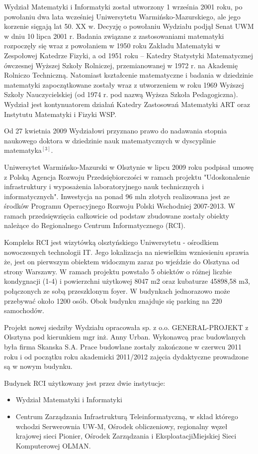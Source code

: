 \documentclass[a4paper,12pt]{article}
\begin{document}
Wydział Matematyki i Informatyki został utworzony 1 września 2001 roku, po powołaniu dwa lata wcześniej Uniwersytetu Warmińsko-Mazurskiego, ale jego korzenie sięgają lat 50. XX w. Decyzję o powołaniu Wydziału podjął Senat UWM w dniu 10 lipca 2001 r. Badania związane z zastosowaniami matematyki rozpoczęły się wraz z powołaniem w 1950 roku Zakładu Matematyki w Zespołowej Katedrze Fizyki, a od 1951 roku – Katedry Statystyki Matematycznej ówczesnej Wyższej Szkoły Rolniczej, przemianowanej w 1972 r. na Akademię Rolniczo Techniczną. Natomiast kształcenie matematyczne i badania w dziedzinie matematyki zapoczątkowane zostały wraz z utworzeniem w roku 1969 Wyższej Szkoły Nauczycielskiej (od 1974 r. pod nazwą  Wyższa Szkoła Pedagogiczna). Wydział jest kontynuatorem działań Katedry Zastosowań Matematyki ART oraz Instytutu Matematyki i Fizyki WSP.

Od 27 kwietnia 2009 Wydziałowi przyznano prawo do nadawania stopnia naukowego doktora w dziedzinie nauk matematycznych w dyscyplinie matematyka$^{[3]}$.

Uniwersytet Warmińsko-Mazurski w Olsztynie w lipcu 2009 roku podpisał umowę z Polską Agencja Rozwoju Przedsiębiorczości w ramach projektu "Udoskonalenie infrastruktury i wyposażenia laboratoryjnego nauk
technicznych i informatycznych". Inwestycja na ponad 96 mln złotych realizowana jest ze środków Programu Operacyjnego Rozwoju Polski Wschodniej 2007-2013. W ramach przedsięwzięcia całkowicie od podstaw
zbudowane zostały obiekty należące do Regionalnego Centrum Informatycznego (RCI).

Kompleks RCI jest wizytówką olsztyńskiego Uniwersytetu - ośrodkiem nowoczesnych technologii IT. Jego lokalizacja na niewielkim wzniesieniu sprawia że, jest on pierwszym obiektem widocznym zaraz po wjeździe do Olsztyna od strony Warszawy. W ramach projektu powstało 5 obiektów o różnej liczbie kondygnacji (1-4) i powierzchni użytkowej 8047 m2 oraz kubaturze 45898,58 m3, połączonych ze sobą przeszklonym foyer. W budynkach jednorazowo może przebywać około 1200 osób. Obok budynku znajduje się parking na 220 samochodów.

Projekt nowej siedziby Wydziału opracowała sp. z o.o. GENERAL-PROJEKT z Olsztyna pod kierunkiem mgr inż. Anny Urban. Wykonawcą prac budowlanych była firma Skanska S.A. Prace budowlane zostały zakończone w czerwcu 2011 roku i od początku roku akademicki 2011/2012 zajęcia dydaktyczne prowadzone
są w nowym budynku.

Budynek RCI użytkowany jest przez dwie instytucje:
\begin{itemize}
\item Wydział Matematyki i Informatyki
\item Centrum Zarządzania Infrastrukturą Teleinformatyczną, w skład którego wchodzi Serwerownia UW-M, Ośrodek obliczeniowy, regionalny węzeł krajowej sieci Pionier, Ośrodek Zarządzania i EksploatacjiMiejskiej Sieci Komputerowej OLMAN.
\end{itemize}
\end{document}
